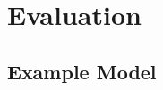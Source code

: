 \documentclass{beamer}
\begin{document}

\section{Evaluation}
\subsection{Example Model}
\end{document}
